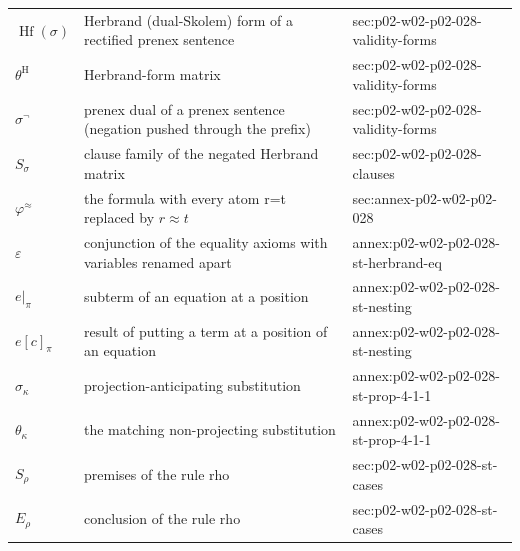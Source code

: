\begin{longtable}{@{}p{}p{}p{}@{}}
\(\operatorname{Hf}(\sigma)\) & Herbrand (dual-Skolem) form of a rectified prenex sentence & sec:\allowbreak{}p02-\allowbreak{}w02-\allowbreak{}p02-\allowbreak{}028-\allowbreak{}validity-\allowbreak{}forms \\
\(\theta^{\mathrm H}\) & Herbrand-form matrix & sec:\allowbreak{}p02-\allowbreak{}w02-\allowbreak{}p02-\allowbreak{}028-\allowbreak{}validity-\allowbreak{}forms \\
\(\sigma^{\neg}\) & prenex dual of a prenex sentence (negation pushed through the prefix) & sec:\allowbreak{}p02-\allowbreak{}w02-\allowbreak{}p02-\allowbreak{}028-\allowbreak{}validity-\allowbreak{}forms \\
\(S_\sigma\) & clause family of the negated Herbrand matrix & sec:\allowbreak{}p02-\allowbreak{}w02-\allowbreak{}p02-\allowbreak{}028-\allowbreak{}clauses \\
\(\varphi^{\approx}\) & the formula with every atom r=t replaced by \(r\approx t\) & sec:\allowbreak{}annex-\allowbreak{}p02-\allowbreak{}w02-\allowbreak{}p02-\allowbreak{}028 \\
\(\varepsilon\) & conjunction of the equality axioms with variables renamed apart & annex:\allowbreak{}p02-\allowbreak{}w02-\allowbreak{}p02-\allowbreak{}028-\allowbreak{}st-\allowbreak{}herbrand-\allowbreak{}eq \\
\(e|_\pi\) & subterm of an equation at a position & annex:\allowbreak{}p02-\allowbreak{}w02-\allowbreak{}p02-\allowbreak{}028-\allowbreak{}st-\allowbreak{}nesting \\
\(e[c]_\pi\) & result of putting a term at a position of an equation & annex:\allowbreak{}p02-\allowbreak{}w02-\allowbreak{}p02-\allowbreak{}028-\allowbreak{}st-\allowbreak{}nesting \\
\(\sigma_\kappa\) & projection-anticipating substitution & annex:\allowbreak{}p02-\allowbreak{}w02-\allowbreak{}p02-\allowbreak{}028-\allowbreak{}st-\allowbreak{}prop-\allowbreak{}4-\allowbreak{}1-\allowbreak{}1 \\
\(\theta_\kappa\) & the matching non-projecting substitution & annex:\allowbreak{}p02-\allowbreak{}w02-\allowbreak{}p02-\allowbreak{}028-\allowbreak{}st-\allowbreak{}prop-\allowbreak{}4-\allowbreak{}1-\allowbreak{}1 \\
\(S_\rho\) & premises of the rule rho & sec:\allowbreak{}p02-\allowbreak{}w02-\allowbreak{}p02-\allowbreak{}028-\allowbreak{}st-\allowbreak{}cases \\
\(E_\rho\) & conclusion of the rule rho & sec:\allowbreak{}p02-\allowbreak{}w02-\allowbreak{}p02-\allowbreak{}028-\allowbreak{}st-\allowbreak{}cases \\

\end{longtable}
